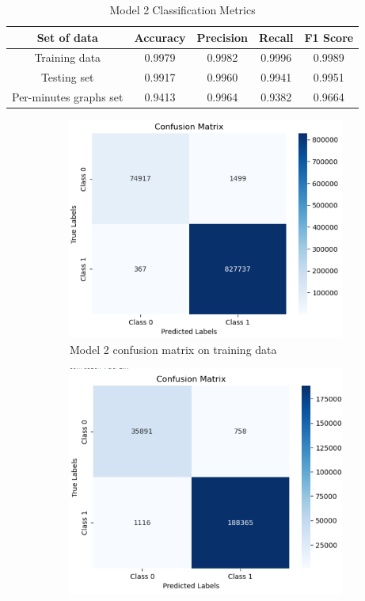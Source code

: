\begin{table}[H]%
\centering
\begin{tabular}{|c|c|c|c|c|}
\hline
Set of data & Accuracy & Precision & Recall & F1 Score \\
\hline
Training data & 0.9979 & 0.9982 & 0.9996 & 0.9989 \\
\hline
Testing set & 0.9917 & 0.9960 & 0.9941 & 0.9951 \\
\hline
Per-minutes graphs set & 0.9413 & 0.9964 & 0.9382 & 0.9664 \\
\hline
\end{tabular}
\caption{Model 2\textcolor{white}{.}Classification\textcolor{white}{.}Metrics}
\label{M2_tab}
\end{table}
\begin{figure}[H]%
    \centering
    \begin{subfigure}{0.49\textwidth}
        \centering
        \includegraphics[width=\linewidth]{figures/ev/2_cm1.png}
        \caption{Model 2 confusion matrix on training data}
    \label{fig:2_cm1}
    \end{subfigure}
    \begin{subfigure}{0.49\textwidth}
        \centering
         \includegraphics[width=\linewidth]{figures/ev/2_cm2.png}

\end{subfigure}
\end{figure}
